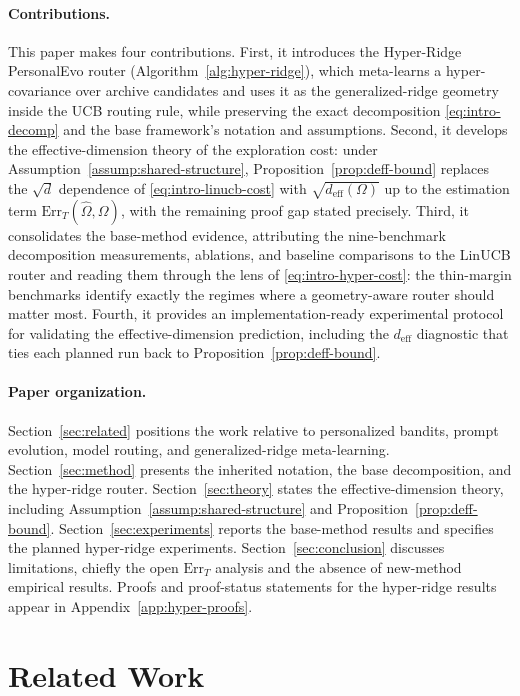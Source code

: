 \documentclass{article} %
\begin{document}
\paragraph{Contributions.}
This paper makes four contributions. First, it introduces the Hyper-Ridge PersonalEvo router (Algorithm~\ref{alg:hyper-ridge}), which meta-learns a hyper-covariance over archive candidates and uses it as the generalized-ridge geometry inside the UCB routing rule, while preserving the exact decomposition \eqref{eq:intro-decomp} and the base framework's notation and assumptions. Second, it develops the effective-dimension theory of the exploration cost: under Assumption~\ref{assump:shared-structure}, Proposition~\ref{prop:deff-bound} replaces the $\sqrt{d}$ dependence of \eqref{eq:intro-linucb-cost} with $\sqrt{d_{\mathrm{eff}}(\Omega)}$ up to the estimation term $\mathrm{Err}_T(\widehat\Omega,\Omega)$, with the remaining proof gap stated precisely. Third, it consolidates the base-method evidence, attributing the nine-benchmark decomposition measurements, ablations, and baseline comparisons to the LinUCB router and reading them through the lens of \eqref{eq:intro-hyper-cost}: the thin-margin benchmarks identify exactly the regimes where a geometry-aware router should matter most. Fourth, it provides an implementation-ready experimental protocol for validating the effective-dimension prediction, including the $d_{\mathrm{eff}}$ diagnostic that ties each planned run back to Proposition~\ref{prop:deff-bound}.

\paragraph{Paper organization.}
Section~\ref{sec:related} positions the work relative to personalized bandits, prompt evolution, model routing, and generalized-ridge meta-learning. Section~\ref{sec:method} presents the inherited notation, the base decomposition, and the hyper-ridge router. Section~\ref{sec:theory} states the effective-dimension theory, including Assumption~\ref{assump:shared-structure} and Proposition~\ref{prop:deff-bound}. Section~\ref{sec:experiments} reports the base-method results and specifies the planned hyper-ridge experiments. Section~\ref{sec:conclusion} discusses limitations, chiefly the open $\mathrm{Err}_T$ analysis and the absence of new-method empirical results. Proofs and proof-status statements for the hyper-ridge results appear in Appendix~\ref{app:hyper-proofs}.

\section{Related Work}
\end{document}
